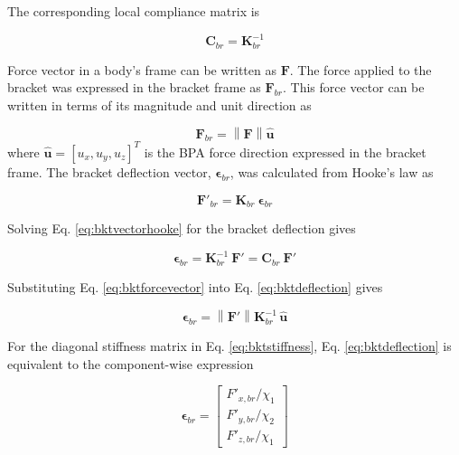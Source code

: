 The corresponding local compliance matrix is 

\begin{equation}
\mathbf{C}_{br} = \mathbf{K}_{br}^{-1}
\label{eq:bktcompliance}
\end{equation}

Force vector in a body's frame can be written as $\mathbf{F}$. The force applied to the bracket was expressed in the bracket frame as $\mathbf{F}_{br}$. This force vector can be written in terms of its magnitude and unit direction as

\begin{equation}
\mathbf{F}_{br} = \left\| \mathbf{F} \right\| \hat{\mathbf{u}}
\label{eq:bktforcevector}
\end{equation}
\noindent
where $\hat{\mathbf{u}} = [u_{x}, u_{y}, u_{z}]^{T}$ is the BPA force direction expressed in the bracket frame. The bracket deflection vector, $\boldsymbol{\epsilon}_{br}$, was calculated from Hooke's law as 

\begin{equation} \mathbf{F}'_{br} = \mathbf{K}_{br} \: \boldsymbol{\epsilon}_{br}
\label{eq:bktvectorhooke}
\end{equation}

Solving Eq. \ref{eq:bktvectorhooke} for the bracket deflection gives

\begin{equation}
\boldsymbol{\epsilon}_{br} = \mathbf{K}_{br}^{-1} \: \mathbf{F}' = \mathbf{C}_{br} \: \mathbf{F}'
\label{eq:bktdeflection}
\end{equation}

Substituting Eq. \ref{eq:bktforcevector} into Eq. \ref{eq:bktdeflection} gives

\begin{equation}
\boldsymbol{\epsilon}_{br} = \left\| \mathbf{F}' \right\| \mathbf{K}_{br}^{-1} \,\hat{\mathbf{u}}
\label{eq:bktdeflectionforceunit}
\end{equation}

For the diagonal stiffness matrix in Eq. \ref{eq:bktstiffness}, Eq. \ref{eq:bktdeflection} is equivalent to the component-wise expression

\begin{equation}
\boldsymbol{\epsilon}_{br} = \begin{bmatrix} F'_{x,br}/\chi_{1} \\ F'_{y,br}/\chi_{2} \\ F'_{z,br}/\chi_{1} \end{bmatrix}
\label{eq:bktcomponentdeflection}
\end{equation}

